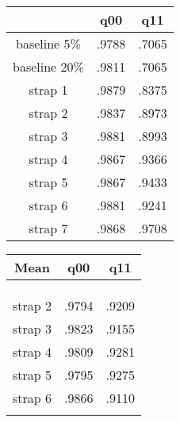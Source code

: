 \documentclass[10pt]{article}
\newcommand{\1}{\mathbbm{1}}
\newcommand{\0}{\mathbf{0}}
\begin{document}
\begin{table}[H]
\centering
\begin{minipage}{.45\textwidth}
    \flushright
    \begin{tabular}{|c|c|c|}
    \hline
                   &   q00   &   q11\\
    \hline
    baseline 5\%   &  .9788   &  .7065  \\
    baseline 20\%  &  .9811   &  .7065  \\
    strap 1        &  .9879   &  .8375  \\
    strap 2        &  .9837   &  .8973  \\
    strap 3        &  .9881   &  .8993  \\
    strap 4        &  .9867   &  .9366  \\
    strap 5        &  .9867   &  .9433  \\
    strap 6        &  .9881   &  .9241  \\
    strap 7        &  .9868   &  .9708  \\
    \hline
    \end{tabular}
\end{minipage}
\begin{minipage}{.5\textwidth}
    \begin{tabular}{|c|c|c|}
    \hline
     Mean    &   q00    &   q11\\
    \hline
    && \\
    && \\
    && \\
    strap 2  &  .9794   &  .9209  \\
    strap 3  &  .9823   &  .9155  \\
    strap 4  &  .9809   &  .9281  \\
    strap 5  &  .9795   &  .9275  \\
    strap 6  &  .9866   &  .9110  \\
    &&\\
    \hline
    \end{tabular}
\end{minipage}
\end{table}
\end{document}
